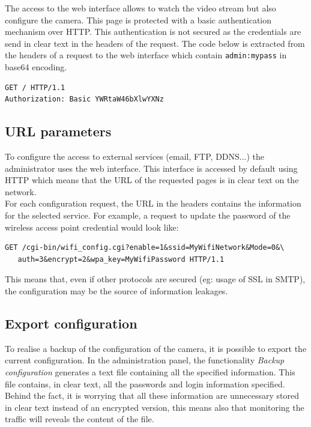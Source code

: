 The access to the web interface allows to watch the video stream but also configure the camera.
This page is protected with a basic authentication mechanism over HTTP.
This authentication is not secured as the credentials are send in clear text in the headers of the request.
The code below is extracted from the headers of a request to the web interface which contain \texttt{admin:mypass} in base64 encoding.

\begin{verbatim}
GET / HTTP/1.1
Authorization: Basic YWRtaW46bXlwYXNz
\end{verbatim}

\subsection{URL parameters}

To configure the access to external services (email, FTP, DDNS...) the administrator uses the web interface.
This interface is accessed by default using HTTP which means that the URL of the requested pages is in clear text on the network.\\

For each configuration request, the URL in the headers contains the information for the selected service.
For example, a request to update the password of the wireless access point credential would look like:
\begin{verbatim}
GET /cgi-bin/wifi_config.cgi?enable=1&ssid=MyWifiNetwork&Mode=0&\
   auth=3&encrypt=2&wpa_key=MyWifiPassword HTTP/1.1
\end{verbatim}

This means that, even if other protocols are secured (eg: usage of SSL in SMTP), the configuration may be the source of information leakages.\\

\subsection{Export configuration}
\label{sec:dcs-config}

To realise a backup of the configuration of the camera, it is possible to export the current configuration.
In the administration panel, the functionality \emph{Backup configuration} generates a text file containing all the specified information.
This file contains, in clear text, all the passwords and login information specified.
Behind the fact, it is worrying that all these information are unnecessary stored in clear text instead of an encrypted version, this means also that monitoring the traffic will reveals the content of the file.

